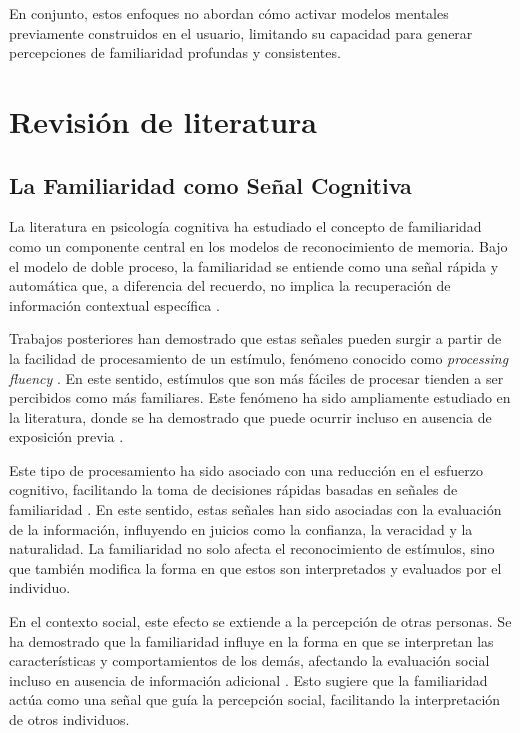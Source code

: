 \documentclass[12pt]{article}
\begin{document}
En conjunto, estos enfoques no abordan cómo activar modelos mentales previamente construidos en el usuario, limitando su capacidad para generar percepciones de familiaridad profundas y consistentes.






\section{Revisión de literatura}

\subsection{La Familiaridad como Señal Cognitiva}
La literatura en psicología cognitiva ha estudiado el concepto de familiaridad como un componente central en los modelos de reconocimiento de memoria. Bajo el modelo de doble proceso, la familiaridad se entiende como una señal rápida y automática que, a diferencia del recuerdo, no implica la recuperación de información contextual específica \cite{mickes_recollection_2009}. 

Trabajos posteriores han demostrado que estas señales pueden surgir a partir de la facilidad de procesamiento de un estímulo, fenómeno conocido como \textit{processing fluency} \cite{mecklinger_fluency_2020}. En este sentido, estímulos que son más fáciles de procesar tienden a ser percibidos como más familiares. Este fenómeno ha sido ampliamente estudiado en la literatura, donde se ha demostrado que puede ocurrir incluso en ausencia de exposición previa \cite{kelley_subjective_1998, wagner_relationship_1998}.

Este tipo de procesamiento ha sido asociado con una reducción en el esfuerzo cognitivo, facilitando la toma de decisiones rápidas basadas en señales de familiaridad \cite{kelley_subjective_1998, wagner_relationship_1998}. En este sentido, estas señales han sido asociadas con la evaluación de la información, influyendo en juicios como la confianza, la veracidad y la naturalidad. La familiaridad no solo afecta el reconocimiento de estímulos, sino que también modifica la forma en que estos son interpretados y evaluados por el individuo.

En el contexto social, este efecto se extiende a la percepción de otras personas. Se ha demostrado que la familiaridad influye en la forma en que se interpretan las características y comportamientos de los demás, afectando la evaluación social incluso en ausencia de información adicional \cite{garciamarques_familiarity_2007}. Esto sugiere que la familiaridad actúa como una señal que guía la percepción social, facilitando la interpretación de otros individuos.
\end{document}

